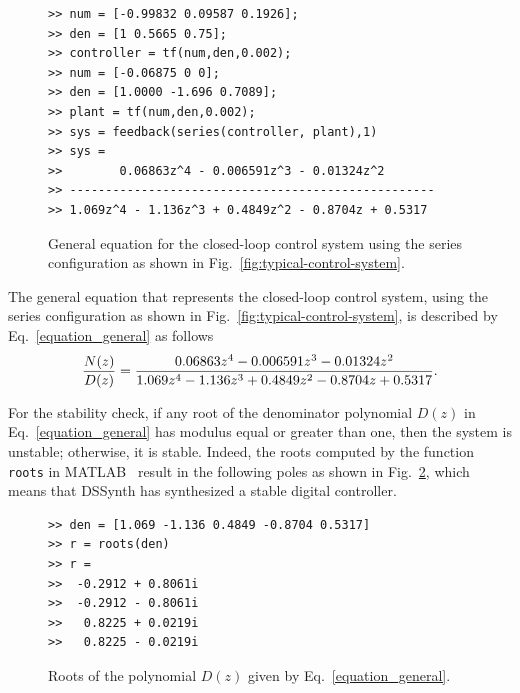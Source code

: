 \documentclass[10pt,conference]{IEEEtran}
\begin{document}
\begin{figure}[ht]
\scriptsize
\begin{lstlisting}[xleftmargin=.025\textwidth,xrightmargin=.025\textwidth, frame=single,]
>> num = [-0.99832 0.09587 0.1926];
>> den = [1 0.5665 0.75];
>> controller = tf(num,den,0.002);
>> num = [-0.06875 0 0];
>> den = [1.0000 -1.696 0.7089];
>> plant = tf(num,den,0.002);
>> sys = feedback(series(controller, plant),1)
>> sys =
>>        0.06863z^4 - 0.006591z^3 - 0.01324z^2
>> ---------------------------------------------------
>> 1.069z^4 - 1.136z^3 + 0.4849z^2 - 0.8704z + 0.5317
\end{lstlisting}
\vspace{-0.2cm}
\caption{General equation for the closed-loop control system using the series configuration as shown in Fig.~\ref{fig:typical-control-system}.}
\label{combine-controller-plant}
\end{figure}

The general equation that represents the closed-loop control system, using the series configuration as shown in Fig.~\ref{fig:typical-control-system},
is described by Eq.~\ref{equation_general} as follows
%
\begin{equation}
\small
\label{equation_general}
\frac{N(z)}{D(z)}=\frac{0.06863z^{4} - 0.006591z^{3} - 0.01324z^{2}}{1.069z^{4} - 1.136z^{3} + 0.4849z^{2} -0.8704z + 0.5317}.
\end{equation}
 
For the stability check, if any root of the denominator polynomial $D(z)$ in
Eq.~\ref{equation_general} has modulus equal or greater than one, then the
system is unstable; otherwise, it is stable.  Indeed, the roots computed by
the function \texttt{roots} in MATLAB~\cite{matlab-toolbox} result in the
following poles as shown in Fig.~\ref{roots-of-dz}, which means that DSSynth
has synthesized a stable digital controller.

\begin{figure}[ht]
\scriptsize
\begin{lstlisting}[xleftmargin=.025\textwidth,xrightmargin=.025\textwidth, frame=single,]
>> den = [1.069 -1.136 0.4849 -0.8704 0.5317]
>> r = roots(den)
>> r =
>>  -0.2912 + 0.8061i
>>  -0.2912 - 0.8061i
>>   0.8225 + 0.0219i
>>   0.8225 - 0.0219i
\end{lstlisting}
\vspace{-0.2cm}
\caption{Roots of the polynomial $D(z)$ given by Eq.~\ref{equation_general}.}
\label{roots-of-dz}
\end{figure}
\end{document}
